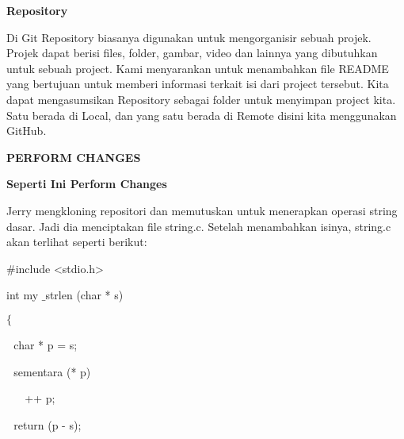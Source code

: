 \vspace{12pt}
\noindent 
{\fontsize{14pt}{14pt}\selectfont \textbf{Repository} \\} \par
\noindent 
Di Git Repository biasanya digunakan untuk mengorganisir sebuah projek. Projek dapat berisi files, folder, gambar, video dan lainnya yang dibutuhkan untuk sebuah project. Kami menyarankan untuk menambahkan file README yang bertujuan untuk memberi informasi terkait isi dari project tersebut. Kita dapat mengasumsikan Repository sebagai folder untuk menyimpan project kita. Satu berada di Local, dan yang satu berada di Remote disini kita menggunakan GitHub. \par
\vspace{12pt}
\noindent 
\begin{center}{\fontsize{14pt}{14pt}\selectfont \textbf{PERFORM CHANGES} \\}\end{center} \par
\noindent 
{\fontsize{14pt}{14pt}\selectfont \textbf{Seperti Ini Perform Changes} \\} \par
\noindent 
 \hspace*{0.5in} Jerry mengkloning repositori dan memutuskan untuk menerapkan operasi string dasar. Jadi dia menciptakan file string.c. Setelah menambahkan isinya, string.c akan terlihat seperti berikut: \par
\vspace{12pt}
\noindent 
 \hspace*{0.5in}  $  \#  $include <stdio.h> \par
\noindent 
 \hspace*{0.5in} int my $  \_  $strlen (char * s) \hspace*{0.5in}  \par
\noindent 
 \hspace*{0.5in}  $  \{  $ \par
\noindent 
 \hspace*{0.5in}  $  $ $  $ $  $char * p = s; \par
\noindent 
 \hspace*{0.5in}  $  $ $  $ $  $sementara (* p) \par
\noindent 
 \hspace*{0.5in}  $  $ $  $ $  $ $  $ $  $ $  $++ p; \par
\noindent 
 \hspace*{0.5in}  $  $ $  $ $  $return (p - s); \par
